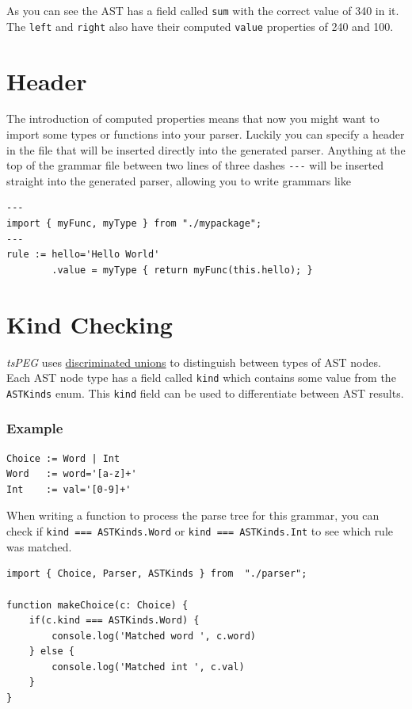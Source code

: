 As you can see the AST has a field called \texttt{sum} with the correct
value of 340 in it. The \texttt{left} and \texttt{right} also have their
computed \texttt{value} properties of 240 and 100.

\section{Header}\label{header}

The introduction of computed properties means that now you might want to
import some types or functions into your parser. Luckily you can specify
a header in the file that will be inserted directly into the generated
parser. Anything at the top of the grammar file between two lines of
three dashes \texttt{-\/-\/-} will be inserted straight into the
generated parser, allowing you to write grammars like

\begin{verbatim}
---
import { myFunc, myType } from "./mypackage";
---
rule := hello='Hello World'
        .value = myType { return myFunc(this.hello); }
\end{verbatim}

\section{Kind Checking}\label{kind-checking}

\emph{tsPEG} uses
\href{https://www.typescriptlang.org/docs/handbook/advanced-types.html\#discriminated-unions}{discriminated
unions} to distinguish between types of AST nodes. Each AST node type
has a field called \texttt{kind} which contains some value from the
\texttt{ASTKinds} enum. This \texttt{kind} field can be used to
differentiate between AST results.

\subsubsection{Example}\label{example}

\begin{verbatim}
Choice := Word | Int
Word   := word='[a-z]+'
Int    := val='[0-9]+'
\end{verbatim}

When writing a function to process the parse tree for this grammar, you
can check if \texttt{kind\ ===\ ASTKinds.Word} or
\texttt{kind\ ===\ ASTKinds.Int} to see which rule was matched.

\begin{verbatim}
import { Choice, Parser, ASTKinds } from  "./parser";

function makeChoice(c: Choice) {
    if(c.kind === ASTKinds.Word) {
        console.log('Matched word ', c.word)
    } else {
        console.log('Matched int ', c.val)
    }
}
\end{verbatim}

